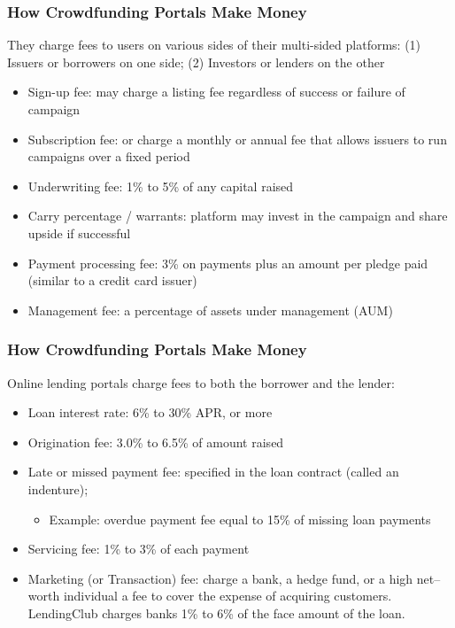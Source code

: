 \documentclass[aspectratio=169]{beamer}
\begin{document}
\begin{frame}
\frametitle{How Crowdfunding Portals Make Money}


They charge fees to users on various sides of their multi-sided platforms: (1) Issuers or borrowers on one side; (2) Investors or lenders on the other
 

\medskip 


\begin{itemize}
    \item Sign-up fee: may charge a listing fee regardless of success or failure of campaign
    \item Subscription fee: or charge a monthly or annual fee that allows issuers to run campaigns over a fixed period
    \item Underwriting fee: 1\% to 5\% of any capital raised
    \item Carry percentage / warrants: platform may invest in the campaign and share upside if successful
    \item Payment processing fee: 3\% on payments plus an amount per pledge paid (similar to a credit card issuer)
    \item Management fee: a percentage of assets under management (AUM)
\end{itemize}



\end{frame} 






\begin{frame}
\frametitle{How Crowdfunding Portals Make Money}


Online lending portals charge fees to both the borrower and the lender:
\begin{itemize}
    \item Loan interest rate: 6\% to 30\% APR, or more
    \item Origination fee: 3.0\% to 6.5\% of amount raised
    \item Late or missed payment fee: specified in the loan contract (called an indenture);
    \begin{itemize}
        \item Example: overdue payment fee equal to 15\% of missing loan payments
    \end{itemize}
    \item Servicing fee: 1\% to 3\% of each payment
    \item Marketing (or Transaction) fee: charge a bank, a hedge fund, or a high net–worth individual a fee to cover the expense of acquiring customers. LendingClub charges banks 1\% to 6\% of the face amount of the loan.
\end{itemize}



\end{frame} 
\end{document}
